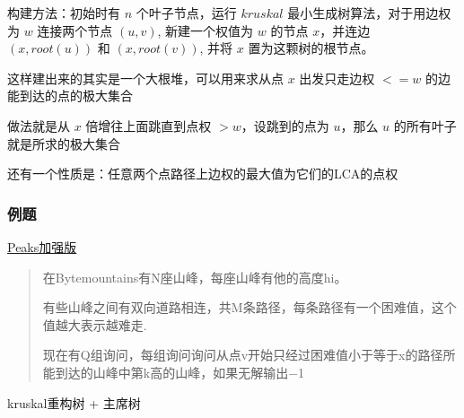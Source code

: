 \documentclass[
]{article}
\begin{document}
构建方法：初始时有 \(n\) 个叶子节点，运行 \(kruskal\)
最小生成树算法，对于用边权为 \(w\) 连接两个节点 \((u,v)\),
新建一个权值为 \(w\) 的节点 \(x\)，并连边 \((x,root(u))\) 和
\((x,root(v))\), 并将 \(x\) 置为这颗树的根节点。

这样建出来的其实是一个大根堆，可以用来求从点 \(x\) 出发只走边权 \(<=w\)
的边能到达的点的极大集合

做法就是从 \(x\) 倍增往上面跳直到点权 \(>w\)，设跳到的点为 \(u\)，那么
\(u\) 的所有叶子就是所求的极大集合

还有一个性质是：任意两个点路径上边权的最大值为它们的LCA的点权

\hypertarget{ux4f8bux9898-1}{%
\subsubsection{例题}\label{ux4f8bux9898-1}}

\href{http://www.lydsy.com/JudgeOnline/problem.php?id=3551}{Peaks加强版}

\begin{quote}
在Bytemountains有N座山峰，每座山峰有他的高度hi。

有些山峰之间有双向道路相连，共M条路径，每条路径有一个困难值，这个值越大表示越难走.

现在有Q组询问，每组询问询问从点v开始只经过困难值小于等于x的路径所能到达的山峰中第k高的山峰，如果无解输出−1
\end{quote}

kruskal重构树 + 主席树
\end{document}
